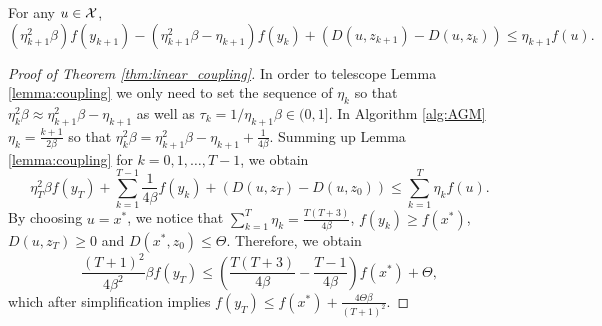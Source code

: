 \begin{lemma}[Coupling]\label{lemma:coupling} For any $u\in\mathcal{X}$,
    \[
        \left(\eta_{k+1}^2 \beta \right) f(y_{k+1}) - \left( \eta^2_{k+1} \beta - \eta_{k+1}\right)f(y_k) + \left( D(u, z_{k+1} ) - D(u, {z_k})\right) \leq \eta_{k+1} f(u).
    \]
\end{lemma}

\begin{proof}[Proof of Theorem \ref{thm:linear_coupling}]
    In order to telescope Lemma \ref{lemma:coupling} we only need to set the sequence of $\eta_k$ so that $\eta_k^2 \beta \approx \eta_{k+1}^2 \beta - \eta_{k+1}$ as well as $\tau_k = 1/\eta_{k+1}\beta \in (0, 1]$. In Algorithm \ref{alg:AGM} $\eta_k =  \frac{k+1}{2\beta}$ so that $\eta_k^2\beta = \eta^2_{k+1}\beta -\eta_{k+1} + \frac{1}{4\beta}$. Summing up Lemma \ref{lemma:coupling} for $k = 0, 1, \dots, T-1$, we obtain
\[
    \eta^2_T \beta f(y_T) + \sum_{k=1}^{T-1}\frac{1}{4\beta}f(y_k) + \left( D(u, {z_T}) - D(u, {z_0})\right) \leq   \sum_{k=1}^T \eta_k f(u).
\]
By choosing $u= x^\ast$, we notice that $\sum_{k=1}^T \eta_k = \frac{T(T+3)}{4\beta}$, $f(y_k) \geq f(x^\ast)$, $D(u, {z_T}) \geq 0$ and $D(x^\ast, {z_0}) \leq \Theta$. Therefore, we obtain
\[
    \frac{(T+1)^2}{4\beta^2}\beta f(y_T) \leq \left(  \frac{T(T+3)}{4\beta} - \frac{T-1}{4\beta}\right)f(x^\ast) + \Theta,
\]
which after simplification implies $f(y_T)\leq f(x^\ast) + \frac{4\Theta \beta}{(T+1)^2}$.
\end{proof}


